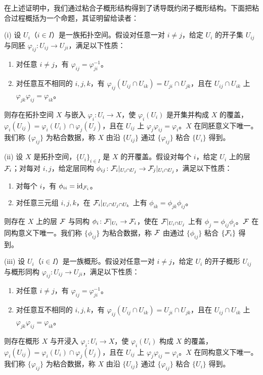在上述证明中，我们通过粘合子概形结构得到了诱导既约闭子概形结构。下面把粘合过程概括为一个命题，其证明留给读者：

\begin{proposition}\label{it:1.3.19}
(i) 设 $U_i$（$i\in I$）是一族拓扑空间。假设对任意一对 $i\ne j$，给定 $U_i$ 的开子集 $U_{ij}$ 与同胚 $\varphi_{ij}\colon U_{ij}\to U_{ji}$，满足以下性质：
\begin{enumerate}[label=(\alph*),leftmargin=2.8em]
  \item 对任意 $i\ne j$，有 $\varphi_{ij}=\varphi_{ji}^{-1}$。
  \item 对任意互不相同的 $i,j,k$，有 $\varphi_{ij}(U_{ij}\cap U_{ik})=U_{ji}\cap U_{jk}$，且在 $U_{ij}\cap U_{ik}$ 上 $\varphi_{jk}\varphi_{ij}=\varphi_{ik}$。
\end{enumerate}
则存在拓扑空间 $X$ 与嵌入 $\varphi_i\colon U_i\to X$，使 $\varphi_i(U_i)$ 是开集并构成 $X$ 的覆盖，$\varphi_i(U_{ij})=\varphi_i(U_i)\cap\varphi_j(U_j)$，且在 $U_{ij}$ 上 $\varphi_j\varphi_{ij}=\varphi_i$。$X$ 在同胚意义下唯一。我们称 $\{\varphi_{ij}\}$ 为粘合数据，称 $X$ 由沿 $\{U_{ij}\}$ 通过 $\{\varphi_{ij}\}$ 粘合 $\{U_i\}$ 得到。

(ii) 设 $X$ 是拓扑空间，$\{U_i\}_{i\in I}$ 是 $X$ 的开覆盖。假设对每个 $i$，给定 $U_i$ 上的层 $\mathcal{F}_i$；对每对 $i,j$，给定层同构 $\phi_{ij}\colon \mathcal{F}_i|_{U_i\cap U_j}\to \mathcal{F}_j|_{U_i\cap U_j}$，满足以下性质：
\begin{enumerate}[label=(\alph*),leftmargin=2.8em]
  \item 对每个 $i$，有 $\phi_{ii}=\operatorname{id}_{\mathcal{F}_i}$。
  \item 对任意三元组 $i,j,k$，在 $\mathcal{F}_i|_{U_i\cap U_j\cap U_k}$ 上有 $\phi_{ik}=\phi_{jk}\phi_{ij}$。
\end{enumerate}
则存在 $X$ 上的层 $\mathcal{F}$ 与同构 $\phi_i\colon \mathcal{F}|_{U_i}\to \mathcal{F}_i$，使在 $\mathcal{F}|_{U_i\cap U_j}$ 上有 $\phi_j=\phi_{ij}\phi_i$。$\mathcal{F}$ 在同构意义下唯一。我们称 $\{\phi_{ij}\}$ 为粘合数据，称 $\mathcal{F}$ 由通过 $\{\phi_{ij}\}$ 粘合 $\{\mathcal{F}_i\}$ 得到。

(iii) 设 $U_i$（$i\in I$）是一族概形。假设对任意一对 $i\ne j$，给定 $U_i$ 的开子概形 $U_{ij}$ 与概形同构 $\varphi_{ij}\colon U_{ij}\to U_{ji}$，满足以下性质：
\begin{enumerate}[label=(\alph*),leftmargin=2.8em]
  \item 对任意 $i\ne j$，有 $\varphi_{ij}=\varphi_{ji}^{-1}$。
  \item 对任意互不相同的 $i,j,k$，有 $\varphi_{ij}(U_{ij}\cap U_{ik})=U_{ji}\cap U_{jk}$，且在 $U_{ij}\cap U_{ik}$ 上 $\varphi_{jk}\varphi_{ij}=\varphi_{ik}$。
\end{enumerate}
则存在概形 $X$ 与开浸入 $\varphi_i\colon U_i\to X$，使 $\varphi_i(U_i)$ 构成 $X$ 的覆盖，$\varphi_i(U_{ij})=\varphi_i(U_i)\cap\varphi_j(U_j)$，且在 $U_{ij}$ 上 $\varphi_j\varphi_{ij}=\varphi_i$。$X$ 在同构意义下唯一。我们称 $\{\varphi_{ij}\}$ 为粘合数据，称 $X$ 由沿 $\{U_{ij}\}$ 通过 $\{\varphi_{ij}\}$ 粘合 $\{U_i\}$ 得到。
\end{proposition}

